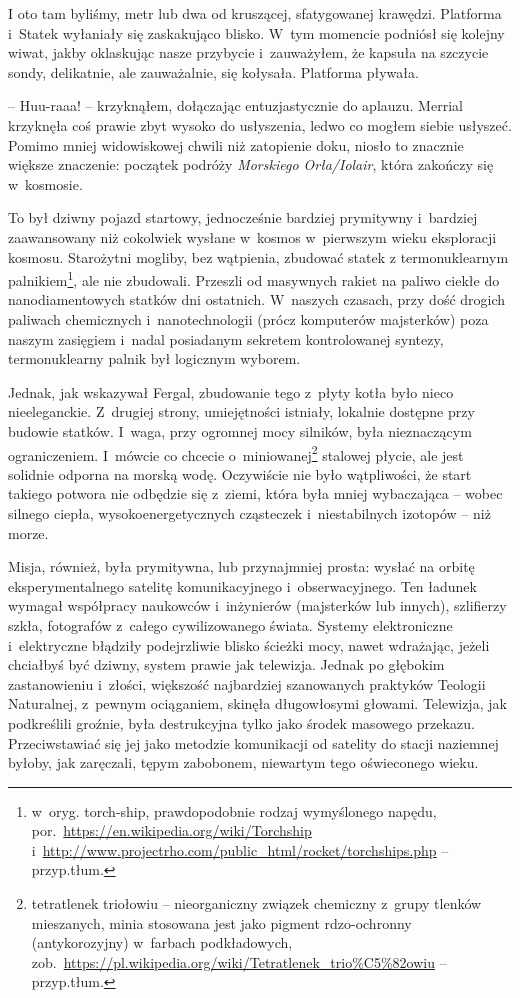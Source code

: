 \documentclass[oneside,polish,11pt,sfheadings]{mwbk}
\begin{document}
I oto tam byliśmy, metr lub dwa od kruszącej, sfatygowanej krawędzi.
Platforma i~Statek wyłaniały się zaskakująco blisko. W~tym momencie
podniósł się kolejny wiwat, jakby oklaskując nasze przybycie i~zauważyłem, że kapsuła na szczycie sondy, delikatnie, ale zauważalnie,
się kołysała. Platforma pływała.

-- Huu-raaa! -- krzyknąłem, dołączając entuzjastycznie do aplauzu. Merrial
krzyknęła coś prawie zbyt wysoko do usłyszenia, ledwo co mogłem siebie
usłyszeć. Pomimo mniej widowiskowej chwili niż zatopienie doku, niosło
to znacznie większe znaczenie: początek podróży \textit{Morskiego
Orła/Iolair}, która zakończy się w~kosmosie.

To był dziwny pojazd startowy, jednocześnie bardziej prymitywny i~bardziej zaawansowany niż cokolwiek wysłane w~kosmos w~pierwszym wieku
eksploracji kosmosu. Starożytni mogliby, bez wątpienia, zbudować statek
z termonuklearnym palnikiem\footnote{ w~oryg. torch-ship, prawdopodobnie
rodzaj wymyślonego napędu,
por.~\url{https://en.wikipedia.org/wiki/Torchship} i~\url{http://www.projectrho.com/public\_html/rocket/torchships.php} -- przyp.tłum.}, ale nie zbudowali. Przeszli od masywnych rakiet na paliwo
ciekłe do nanodiamentowych statków dni ostatnich. W~naszych czasach,
przy dość drogich paliwach chemicznych i~nanotechnologii (prócz
komputerów majsterków) poza naszym zasięgiem i~nadal posiadanym sekretem kontrolowanej
syntezy, termonuklearny palnik był logicznym wyborem.

Jednak, jak wskazywał Fergal, zbudowanie tego z~płyty kotła było nieco
nieeleganckie. Z~drugiej strony, umiejętności istniały, lokalnie
dostępne przy budowie statków. I~waga, przy ogromnej mocy silników, była
nieznaczącym ograniczeniem. I~mówcie co chcecie o~miniowanej\footnote{tetratlenek triołowiu -- nieorganiczny związek chemiczny z~grupy tlenków mieszanych, minia stosowana jest jako pigment
rdzo-ochronny (antykorozyjny) w~farbach podkładowych,
zob.~\url{https://pl.wikipedia.org/wiki/Tetratlenek\_trio\%C5\%82owiu} -- przyp.tłum.
} stalowej płycie, ale jest solidnie odporna na morską wodę. Oczywiście nie
było wątpliwości, że start takiego potwora nie odbędzie się z~ziemi,
która była mniej wybaczająca -- wobec silnego ciepła, wysokoenergetycznych
cząsteczek i~niestabilnych izotopów -- niż morze.

Misja, również, była prymitywna, lub przynajmniej prosta: wysłać na
orbitę eksperymentalnego satelitę komunikacyjnego i~obserwacyjnego. Ten
ładunek wymagał współpracy naukowców i~inżynierów (majsterków lub
innych), szlifierzy szkła, fotografów z~całego cywilizowanego świata.
Systemy elektroniczne i~elektryczne błądziły podejrzliwie blisko ścieżki
mocy, nawet wdrażając, jeżeli chciałbyś być dziwny, system prawie jak
telewizja. Jednak po głębokim zastanowieniu i~złości, większość
najbardziej szanowanych praktyków Teologii Naturalnej, z~pewnym
ociąganiem, skinęła długowłosymi głowami. Telewizja, jak podkreślili
groźnie, była destrukcyjna tylko jako środek masowego przekazu.
Przeciwstawiać się jej jako metodzie komunikacji od satelity do stacji
naziemnej byłoby, jak zaręczali, tępym zabobonem, niewartym tego
oświeconego wieku.
\end{document}
